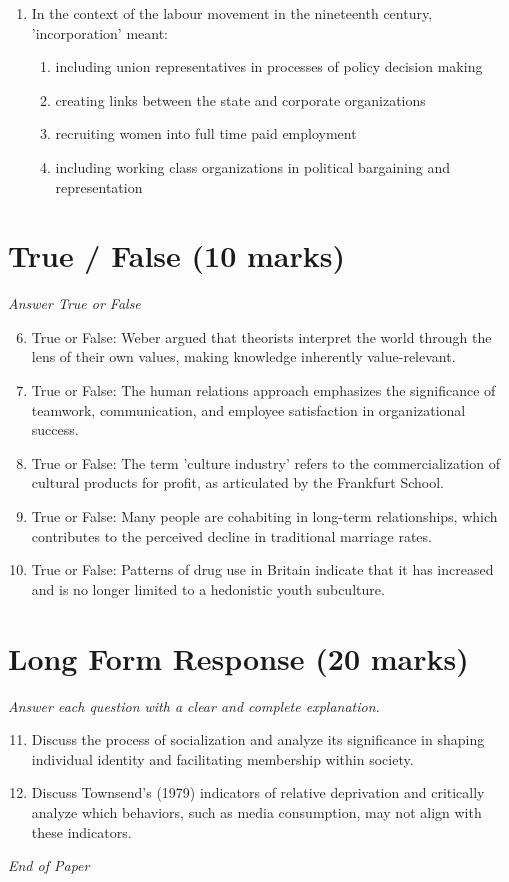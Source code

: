 \documentclass[12pt]{article}
\begin{document}
\begin{enumerate}[label=\arabic*.]
\begin{enumerate}[label=(\alph*)]
    \item each other and humanity in general
    \item all of the above
\end{enumerate}
\item In the context of the labour movement in the nineteenth century, 'incorporation' meant:
\begin{enumerate}[label=(\alph*)]
    \item including union representatives in processes of policy decision making
    \item creating links between the state and corporate organizations
    \item recruiting women into full time paid employment
    \item including working class organizations in political bargaining and representation
\end{enumerate}
\end{enumerate}

\section*{True / False (10 marks)}
\textit{Answer True or False}
\begin{enumerate}[label=\arabic*.]
\setcounter{enumi}{5}
\item True or False: Weber argued that theorists interpret the world through the lens of their own values, making knowledge inherently value-relevant.
\item True or False: The human relations approach emphasizes the significance of teamwork, communication, and employee satisfaction in organizational success.
\item True or False: The term 'culture industry' refers to the commercialization of cultural products for profit, as articulated by the Frankfurt School.
\item True or False: Many people are cohabiting in long-term relationships, which contributes to the perceived decline in traditional marriage rates.
\item True or False: Patterns of drug use in Britain indicate that it has increased and is no longer limited to a hedonistic youth subculture.
\end{enumerate}

\section*{Long Form Response (20 marks)}
\textit{Answer each question with a clear and complete explanation.}
\begin{enumerate}[label=\arabic*.]
\setcounter{enumi}{10}
\item Discuss the process of socialization and analyze its significance in shaping individual identity and facilitating membership within society.
\item Discuss Townsend's (1979) indicators of relative deprivation and critically analyze which behaviors, such as media consumption, may not align with these indicators.
\end{enumerate}

\vfill
\noindent\textit{End of Paper}
\end{document}
